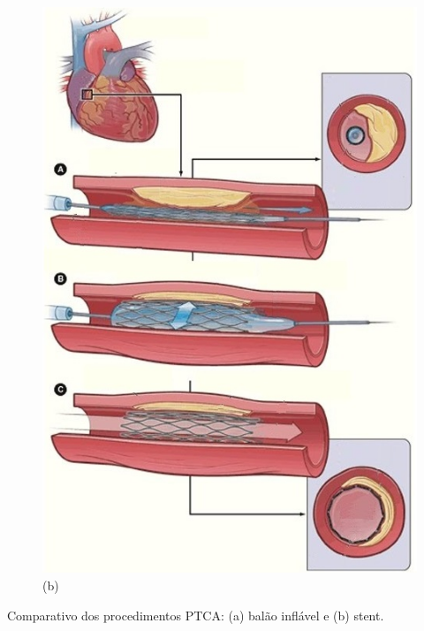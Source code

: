 \begin{frame}
\begin{figure}[H]
\begin{minipage}{.50\linewidth}
      \includegraphics[scale=0.3]{images/stent_bare.jpg}\\
      \scriptsize (b)
     \end{minipage}
\end{figure}
     \centering
     {\scriptsize Comparativo dos procedimentos PTCA:
              (a) balão inflável e
              (b) stent.}
\end{frame}


